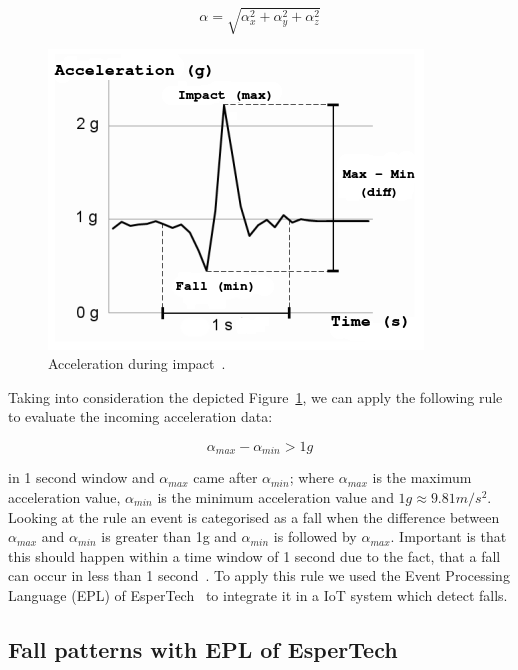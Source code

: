 \documentclass[conference]{IEEEtran}
\theoremstyle{definition}
\begin{document}
\begin{equation}\label{eq:acel}
 \alpha = \sqrt{\alpha_{x}^{2} + \alpha_{y}^{2} + \alpha_{z}^{2}}
\end{equation}
\begin{figure}[!h]
  \centering
  \includegraphics[scale=0.75]{img/FallGraph}
  \caption[Acceleration during impact]{Acceleration during impact~\cite{Kozina}.}
  \label{fig:grafica}
\end{figure}

Taking into consideration the depicted Figure~\ref{fig:grafica}, we can apply the following rule to evaluate the incoming acceleration data:

\begin{equation}\label{eq:caida}
 \alpha_{max} - \alpha_{min} > 1g
\end{equation}

in 1 second window and $\alpha_{max}$ came after $\alpha_{min}$; where $\alpha_{max}$ is the maximum acceleration value, 
$\alpha_{min}$ is the minimum acceleration value and $1g\approx9.81m/s^{2}$. Looking at the rule an event is categorised as a fall when the 
difference between $\alpha_{max}$ and $\alpha_{min}$ is greater than 1g and $\alpha_{min}$ is followed by $\alpha_{max}$. 
Important is that this should happen within a time window of 1 second due to the fact, that a fall can occur in less than 1 second~\cite{Luder2009}.
To apply this rule we used the Event Processing Language (EPL) of EsperTech~\cite{Esper:2016} to integrate it in a IoT system which detect falls.

\subsection{Fall patterns with EPL of EsperTech}
\end{document}
